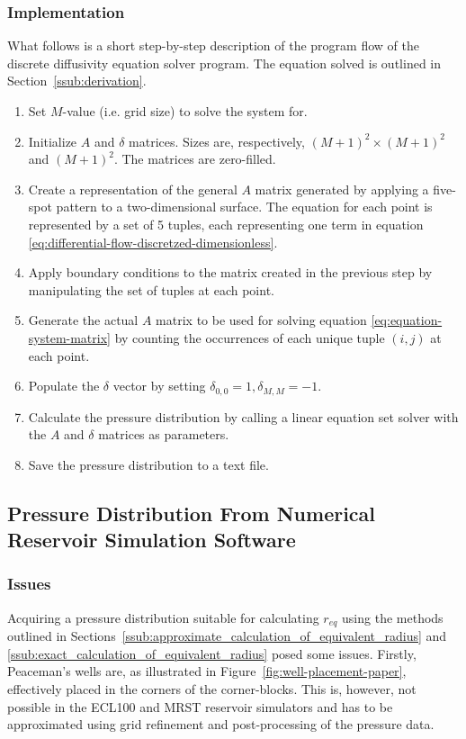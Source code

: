 \subsubsection{Implementation} %
\label{ssub:implementation}
What follows is a short step-by-step description of the program flow of the discrete diffusivity equation solver program. The equation solved is outlined in Section~\ref{ssub:derivation}.
\begin{enumerate}
    \item Set $M$-value (i.e. grid size) to solve the system for.
    \item Initialize $A$ and $\delta$ matrices. Sizes are, respectively, $(M+1)^2 \times (M+1)^2$ and $(M+1)^2$. The matrices are zero-filled.
    \item Create a representation of the general $A$ matrix generated by applying a five-spot pattern to a two-dimensional surface. The equation for each point is represented by a set of 5 tuples, each representing one term in equation \eqref{eq:differential-flow-discretzed-dimensionless}.
    \item Apply boundary conditions to the matrix created in the previous step by manipulating the set of tuples at each point.
    \item Generate the actual $A$ matrix to be used for solving equation \eqref{eq:equation-system-matrix} by counting the occurrences of each unique tuple $(i,j)$ at each point.
    \item Populate the $\delta$ vector by setting $\delta_{0,0}=1,\delta_{M,M}=-1$.
    \item Calculate the pressure distribution by calling a linear equation set solver with the $A$ and $\delta$ matrices as parameters.
    \item Save the pressure distribution to a text file.
\end{enumerate}


\subsection{Pressure Distribution From Numerical Reservoir Simulation Software} %
\label{sub:using_pressure_distribution_from_numerical_reservoir_simulation_software}

\subsubsection{Issues} %
\label{ssub:issues_and_approximations}
Acquiring a pressure distribution suitable for calculating $r_{eq}$ using the methods outlined in Sections~\ref{ssub:approximate_calculation_of_equivalent_radius} and \ref{ssub:exact_calculation_of_equivalent_radius} posed some issues. Firstly, Peaceman's wells are, as illustrated in Figure~\ref{fig:well-placement-paper}, effectively placed in the corners of the corner-blocks. This is, however, not possible in the ECL100 and MRST reservoir simulators and has to be approximated using grid refinement and post-processing of the pressure data.

